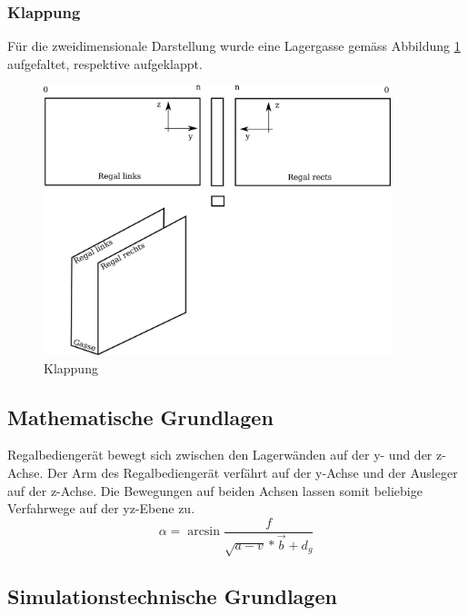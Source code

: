 \subsubsection{Klappung}
Für die zweidimensionale Darstellung wurde eine Lagergasse gemäss Abbildung \ref{fig:klapp} aufgefaltet, respektive aufgeklappt.
%
\begin{figure}[h]
  \begin{center}
    \includegraphics[width=0.9\textwidth]{images/klappung.png}
    \caption{Klappung}
    \label{fig:klapp}
  \end{center}
\end{figure}

%
\subsection{Mathematische Grundlagen}
Regalbediengerät bewegt sich zwischen den Lagerwänden auf der y- und der z-Achse. Der Arm des Regalbediengerät verfährt auf der y-Achse und der Ausleger auf der z-Achse. Die Bewegungen auf beiden Achsen lassen somit beliebige Verfahrwege auf der yz-Ebene zu. 
%
\begin{equation}
\alpha = \arcsin \frac{f}{\sqrt{a-v} * \vec{b} + d_{g}}
\end{equation}



%
\subsection{Simulationstechnische Grundlagen}






